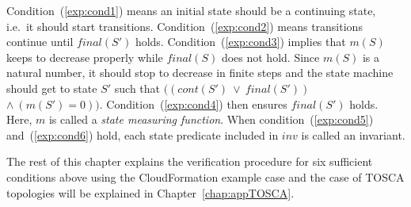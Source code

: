 \documentclass[12pt]{report}
\begin{document}
Condition~(\ref{exp:cond1}) means an initial state should be a
continuing state, i.e.\ it should start
transitions. Condition~(\ref{exp:cond2}) means transitions continue
until $final(S')$ holds. Condition~(\ref{exp:cond3}) implies that
$m(S)$ keeps to decrease properly while $final(S)$ does not
hold. Since $m(S)$ is a natural number, it should stop to decrease in
finite steps and the state machine should get to state $S'$ such that
$((cont(S')\ \lor\ final(S'))$ $\land\ (m(S') = 0))$.
Condition~(\ref{exp:cond4}) then ensures $final(S')$ holds. Here, $m$ is
called a {\it state measuring function}. When
condition~(\ref{exp:cond5}) and~(\ref{exp:cond6}) hold, each state
predicate included in $inv$ is called an invariant.

The rest of this chapter explains the verification procedure for six
sufficient conditions above using the CloudFormation example case and
the case of TOSCA topologies will be explained in
Chapter~\ref{chap:appTOSCA}.

\end{document}
